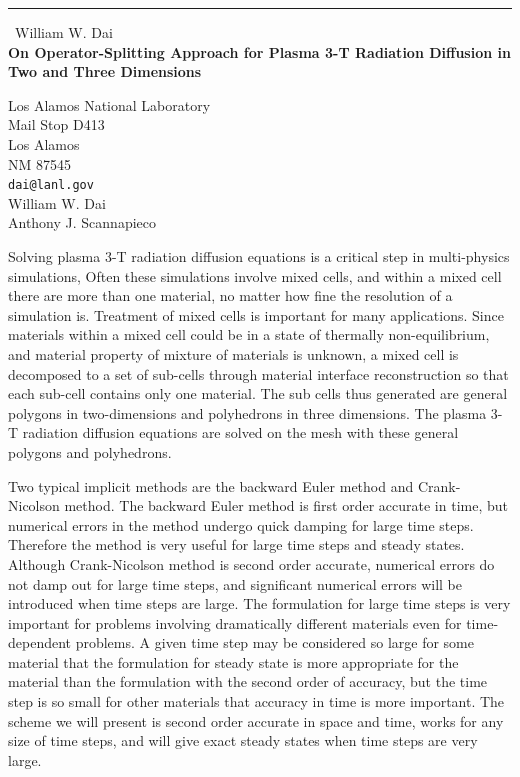 \documentclass{report}
\begin{document}
\begin{center}
\rule{6in}{1pt} \
{\large William W. Dai \\
{\bf On Operator-Splitting Approach for Plasma 3-T Radiation Diffusion in Two and Three Dimensions}}

Los Alamos National Laboratory \\ Mail Stop D413 \\ Los Alamos \\ NM 87545
\\
{\tt dai@lanl.gov}\\
William W. Dai\\
Anthony J. Scannapieco\end{center}

Solving plasma 3-T radiation diffusion equations is a critical step in
multi-physics simulations,
Often these simulations involve mixed cells, and within a mixed cell
there are more than one material, no matter how fine the resolution of a
simulation is. Treatment of mixed cells is important for many
applications. Since materials within a mixed cell could be in a state of
thermally non-equilibrium, and material property of mixture of materials
is unknown, a mixed cell is decomposed to a set of sub-cells through
material interface reconstruction so that each sub-cell contains only one
material. The sub cells thus generated are general polygons in
two-dimensions and polyhedrons in three dimensions. The plasma 3-T
radiation diffusion equations are solved on the mesh with these general
polygons and polyhedrons.


Two typical implicit methods are the backward Euler method and Crank-Nicolson method.
The backward Euler method is first order accurate in time, but numerical
errors in the method undergo quick damping for large time steps.
Therefore the method is very useful for large time steps and steady
states. Although Crank-Nicolson method is second order accurate,
numerical errors do not damp out for large time steps, and significant
numerical errors will be introduced when time steps are large. The
formulation for large time steps is very important for problems involving
dramatically different materials even for time-dependent problems. A
given time step may be considered so large for some material that the
formulation for steady state is more appropriate for the material than
the formulation with the second order of accuracy, but the time step is
so small for other materials that accuracy in time is more important. The
scheme we will present is second order accurate in space and time, works
for any size of time steps, and will give exact steady states when time
steps are very large.
\end{document}
